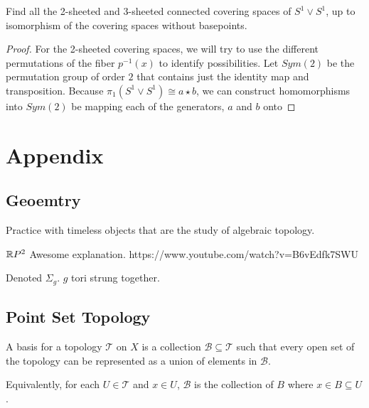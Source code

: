 \documentclass[10pt]{article}
\begin{document}
\begin{exercise}
	Find all the 2-sheeted and 3-sheeted connected covering spaces of $S^1 \vee
	S^1$, up to isomorphism of the covering spaces without basepoints.
\end{exercise}

\begin{proof}
	For the 2-sheeted covering spaces, we will try to use the different
	permutations of the fiber $p^{-1}(x)$ to identify possibilities. Let $Sym(2)$
	be the permutation group of order $2$ that contains just the identity map and
	transposition. Because $\pi_1(S^1 \vee S^1) \cong a \star b$, we can
	construct homomorphisms into $Sym(2)$ be mapping each of the generators, $a$
	and $b$ onto 
\end{proof}

\section{Appendix}

\subsection{Geoemtry}

Practice with timeless objects that are the study of algebraic topology.

\begin{note}
	$\mathbb{R} P^2$
Awesome explanation. https://www.youtube.com/watch?v=B6vEdfk7SWU
\end{note}

\begin{note}
Denoted $\Sigma_g$. $g$ tori strung together.
\end{note}

\subsection{Point Set Topology}

\begin{definition}[Basis]

	A basis for a topology $\mathscr{T}$ on $X$ is a collection $\mathscr{B}
	\subseteq \mathscr{T}$ such that every open set of the topology can be
	represented as a union of elements in $\mathscr{B}$.

	Equivalently, for each $U \in \mathscr{T}$ and $x \in U$, $\mathscr{B}$
	is the collection of $B$ where $x \in B \subseteq U$.

\end{definition}
\end{document}
